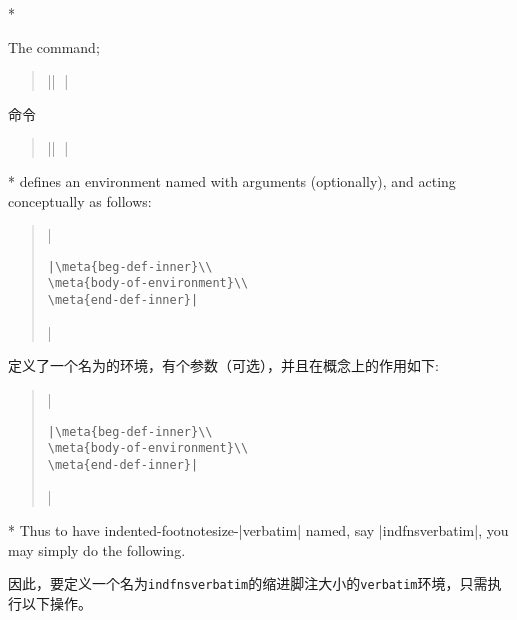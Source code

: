 \begin{paracol}{2}
\switchcolumn[0]*

\DescribeMacro{\newverbatim}
The command;
\begin{quote}
|\newverbatim|
	|%

\end{quote}
\switchcolumn
命令
\begin{quote}
|\newverbatim|
    |%

\end{quote}

\switchcolumn[0]*
defines an environment named  with  arguments
(optionally), and acting conceptually as follows:
\begin{quote}
|\begin{verbatim}|\meta{beg-def-inner}\\
\meta{body-of-environment}\\
\meta{end-def-inner}|\end{verbatim}|
\end{quote}
\switchcolumn
定义了一个名为的环境，有个参数（可选），并且在概念上的作用如下:
\begin{quote}
|\begin{verbatim}|\meta{beg-def-inner}\\
\meta{body-of-environment}\\
\meta{end-def-inner}|\end{verbatim}|
\end{quote}

\switchcolumn[0]*
Thus to have indented-footnotesize-|verbatim| named, say |indfnsverbatim|, 
you may simply do the following.
\switchcolumn
因此，要定义一个名为\texttt{indfnsverbatim}的缩进脚注大小的\texttt{verbatim}环境，只需执行以下操作。


\end{paracol}
